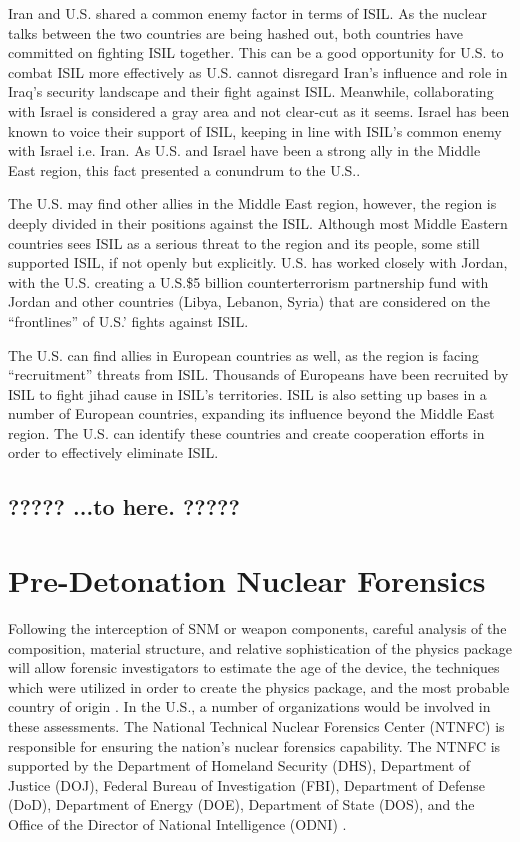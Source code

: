 \documentclass{report}
\begin{document}
Iran and U.S. shared a common enemy factor in terms of ISIL. As the nuclear talks between the two countries are being hashed out, both countries have committed on fighting ISIL together. This can be a good opportunity for U.S. to combat ISIL more effectively as U.S. cannot disregard Iran's influence and role in Iraq's security landscape and their fight against ISIL.
Meanwhile, collaborating with Israel is considered a gray area and not clear-cut as it seems. Israel has been known to voice their support of ISIL, keeping in line with ISIL's common enemy with Israel i.e. Iran. As U.S. and Israel have been a strong ally in the Middle East region, this fact presented a conundrum to the U.S..

The U.S. may find other allies in the Middle East region, however, the region is deeply divided in their positions against the ISIL. Although most Middle Eastern countries sees ISIL as a serious threat to the region and its people, some still supported ISIL, if not openly but explicitly. U.S. has worked closely with Jordan, with the U.S. creating a U.S.\$5 billion counterterrorism partnership fund with Jordan and other countries (Libya, Lebanon, Syria) that are considered on the \enquote{frontlines} of U.S.' fights against ISIL.

The U.S. can find allies in European countries as well, as the region is facing \enquote{recruitment} threats from ISIL. Thousands of Europeans have been recruited by ISIL to fight jihad cause in ISIL's territories. ISIL is also setting up bases in a number of European countries, expanding its influence beyond the Middle East region. The U.S. can identify these countries and create cooperation efforts in order to effectively eliminate ISIL.

\subsection{????? ...to here. ?????}


\section{Pre-Detonation Nuclear Forensics}

Following the interception of SNM or weapon components, careful analysis of the composition, material structure, and relative sophistication of the physics package will allow forensic investigators to estimate the age of the device, the techniques which were utilized in order to create the physics package, and the most probable country of origin \cite{Glaser2008}. In the U.S., a number of organizations would be involved in these assessments. The National Technical Nuclear Forensics Center (NTNFC) is responsible for ensuring the nation's nuclear forensics capability.  The NTNFC is supported by the Department of Homeland Security (DHS), Department of Justice (DOJ), Federal Bureau of Investigation (FBI), Department of Defense (DoD), Department of Energy (DOE), Department of State (DOS), and the Office of the Director of National Intelligence (ODNI) \cite{DepartmentOfHomelandSecurit}. 
\end{document}
